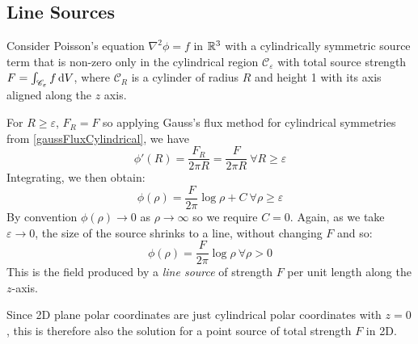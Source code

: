 \documentclass[../main.tex]{subfiles}
\begin{document}
\subsection{Line Sources}
Consider Poisson's equation $\nabla^2 \phi = f$ in $\mathbb{R}^3$ with a cylindrically symmetric source term that is non-zero only in the cylindrical region $\mathscr{C}_\varepsilon$ with total source strength $F = \int_{\mathscr{C}_\varepsilon} f \d{V}$, where $\mathscr{C}_R$ is a cylinder of radius $R$ and height 1 with its axis aligned along the $z$ axis.

For $R \geq \varepsilon$, $F_R = F$ so applying Gauss's flux method for cylindrical symmetries from \cref{gaussFluxCylindrical}, we have
\[
  \phi'(R) = \frac{F_R}{2\pi R} = \frac{F}{2\pi R}\ \forall R \geq \varepsilon
\]
Integrating, we then obtain:
\[
  \phi(\rho) = \frac{F}{2\pi}\log \rho + C\ \forall \rho \geq \varepsilon
\]
By convention $\phi(\rho) \to 0$ as $\rho \to \infty$ so we require $C = 0$.
Again, as we take $\varepsilon \to 0$, the size of the source shrinks to a line, without changing $F$ and so:
\[
  \phi(\rho) = \frac{F}{2\pi}\log\rho\ \forall \rho > 0
\]
This is the field produced by a \textit{line source} of strength $F$ per unit length along the $z$-axis.
\begin{remark}[Note]
  Since 2D plane polar coordinates are just cylindrical polar coordinates with $z = 0$, this is therefore also the solution for a point source of total strength $F$ in 2D.
\end{remark}
\end{document}
